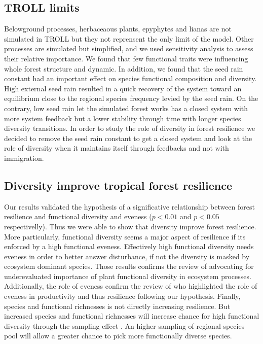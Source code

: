 \documentclass[12pt,]{article}
\theoremstyle{definition}
\theoremstyle{definition}
\theoremstyle{remark}
\begin{document}
\subsection{TROLL limits}\label{troll-limits}

Belowground processes, herbaceaous plants, epyphytes and lianas are not
simulated in TROLL but they not reprensent the only limit of the model.
Other processes are simulated but simplified, and we used sensitivity
analysis to assess their relative importance. We found that few
functional traits were influencing whole forest structure and dynamic.
In addition, we found that the seed rain constant had an important
effect on species functional composition and diversity. High external
seed rain resulted in a quick recovery of the system toward an
equilibrium close to the regional species frequency levied by the seed
rain. On the contrary, low seed rain let the simulated forest works has
a closed system with more system feedback but a lower stability through
time with longer species diversity transitions. In order to study the
role of diversity in forest resilience we decided to remove the seed
rain constant to get a closed system and look at the role of diversity
when it maintains itself through feedbacks and not with immigration.

\subsection{Diversity improve tropical forest
resilience}\label{diversity-improve-tropical-forest-resilience}

Our results validated the hypothesis of a significative relationship
between forest resilience and functional diversity and eveness
(\(p < 0.01\) and \(p < 0.05\) respectivelly). Thus we were able to show
that diversity improve forest resilience. More particularly, functional
diversity seems a major aspect of resilience if its enforced by a high
functional eveness. Effectively high functional diversity needs eveness
in order to better answer disturbance, if not the diversity is masked by
ecosystem dominant species. Those results confirms the review of
\citet{Diaz2001} advocating for underevaluated importance of plant
functional diversity in ecosystem processes. Additionally, the role of
eveness confirm the review of \citet{Zhang2012} who highlighted the role
of eveness in productivity and thus resilience following our hypothesis.
Finally, species and functional richnesses is not directly increasing
resilience. But increased species and functional richnesses will
increase chance for high functional diversity through the sampling
effect \citep{Loreau1998}. An higher sampling of regional species pool
will allow a greater chance to pick more functionally diverse species.
\end{document}
